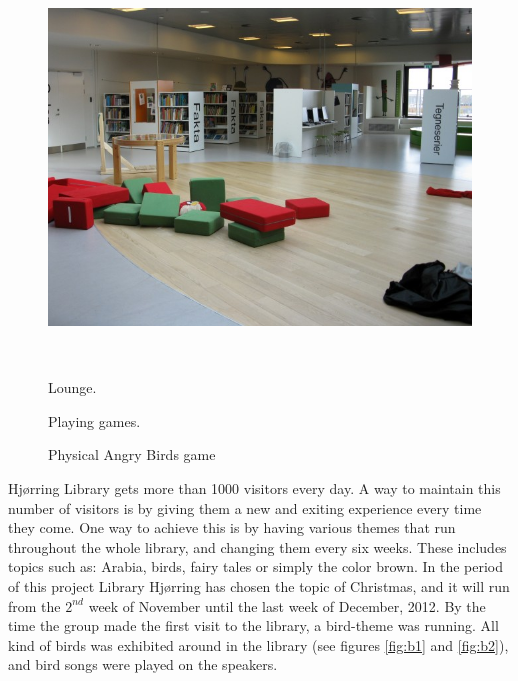 \begin{figure}[htbp]
\begin{minipage}[b]{0.3\textwidth}
		\includegraphics[width=1.00\textwidth]{Pictures/HjoerringLibrary/p3.jpg} %
	\end{minipage}\\ %
	\begin{minipage}[t]{0.3\textwidth}
		\caption{Lounge.} %
		\label{fig:p1}
	\end{minipage}\hfill
	\begin{minipage}[t]{0.3\textwidth}
		\caption{Playing games.} %
		\label{fig:p2}
	\end{minipage}\hfill	
	\begin{minipage}[t]{0.3\textwidth}
		\caption{Physical Angry Birds game} %
		\label{fig:p3}
	\end{minipage}
\end{figure}

Hj{\o}rring Library gets more than 1000 visitors every day. A way to maintain this number of visitors is by giving them a new and exiting experience every time they come. One way to achieve this is by having various themes that run throughout the whole library, and changing them every six weeks. These includes topics such as: Arabia, birds, fairy tales or simply the color brown. In the period of this project Library Hj{\o}rring has chosen the topic of Christmas, and it will run from the $2^{nd}$ week of November until the last week of December, 2012. By the time the group made the first visit to the library, a bird-theme was running. All kind of birds was exhibited around in the library (see figures \ref{fig:b1} and \ref{fig:b2}), and bird songs were played on the speakers.

